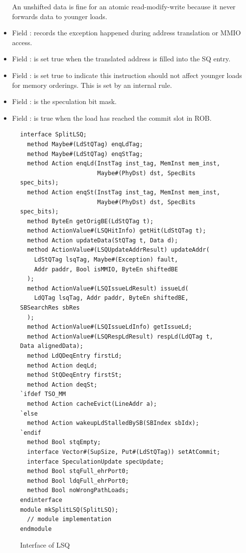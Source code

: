 \begin{itemize}
    An unshifted data is fine for an atomic read-modify-write because it never forwards data to younger loads.
    \item Field : records the exception happened during address translation or MMIO access.
    \item Field : is set true when the translated address is filled into the SQ entry.
    \item Field : is set true to indicate this instruction should not affect younger loads for memory orderings.
    This is set by an internal rule.
    \item Field : is the speculation bit mask.
    \item Field : is true when the load has reached the commit slot in ROB.
\end{itemize}

\begin{figure}
\begin{lstlisting}[caption={}]
interface SplitLSQ;
  method Maybe#(LdStQTag) enqLdTag;
  method Maybe#(LdStQTag) enqStTag;
  method Action enqLd(InstTag inst_tag, MemInst mem_inst,
                      Maybe#(PhyDst) dst, SpecBits spec_bits);
  method Action enqSt(InstTag inst_tag, MemInst mem_inst,
                      Maybe#(PhyDst) dst, SpecBits spec_bits);
  method ByteEn getOrigBE(LdStQTag t);
  method ActionValue#(LSQHitInfo) getHit(LdStQTag t);
  method Action updateData(StQTag t, Data d);
  method ActionValue#(LSQUpdateAddrResult) updateAddr(
    LdStQTag lsqTag, Maybe#(Exception) fault,
    Addr paddr, Bool isMMIO, ByteEn shiftedBE
  );
  method ActionValue#(LSQIssueLdResult) issueLd(
    LdQTag lsqTag, Addr paddr, ByteEn shiftedBE, SBSearchRes sbRes
  );
  method ActionValue#(LSQIssueLdInfo) getIssueLd;
  method ActionValue#(LSQRespLdResult) respLd(LdQTag t, Data alignedData);
  method LdQDeqEntry firstLd;
  method Action deqLd;
  method StQDeqEntry firstSt;
  method Action deqSt;
`ifdef TSO_MM
  method Action cacheEvict(LineAddr a);
`else
  method Action wakeupLdStalledBySB(SBIndex sbIdx);
`endif
  method Bool stqEmpty;
  interface Vector#(SupSize, Put#(LdStQTag)) setAtCommit;
  interface SpeculationUpdate specUpdate;
  method Bool stqFull_ehrPort0;
  method Bool ldqFull_ehrPort0;
  method Bool noWrongPathLoads;
endinterface
module mkSplitLSQ(SplitLSQ);
  // module implementation
endmodule
\end{lstlisting}
\caption{Interface of LSQ}\label{fig:lsq-ifc}
\end{figure}

